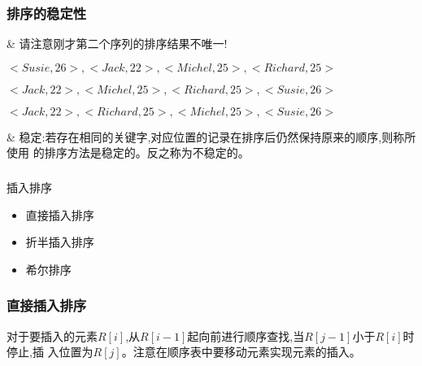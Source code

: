 \begin{frame}[fragile]
  \frametitle{排序的稳定性}
  \begin{easylist} \easyitem

    & 请注意刚才第二个序列的排序结果不唯一!

    $<Susie,26>, <Jack,22>, <Michel,25>, <Richard,25>$

    \color{red} $<Jack,22>,<Michel,25>, <Richard, 25>, <Susie,26>$

    \color{blue} $<Jack,22>, <Richard, 25>, <Michel,25>, <Susie,26>$
    
    & 稳定:若存在相同的关键字,对应位置的记录在排序后仍然保持原来的顺序,则称所使用
    的排序方法是稳定的。反之称为不稳定的。

  \end{easylist}
\end{frame}

\begin{frame}[fragile]
  \frametitle{}
  \begin{sectionbox}{插入排序}
    \begin{itemize}
    \item 直接插入排序
    \item 折半插入排序
    \item 希尔排序
    \end{itemize}
  \end{sectionbox}
\end{frame}

\begin{frame}[fragile]
  \frametitle{直接插入排序}

  对于要插入的元素$R[i]$,从$R[i-1]$起向前进行顺序查找,当$R[j-1]$小于$R[i]$时停止,插
  入位置为$R[j]$。注意在顺序表中要移动元素实现元素的插入。
  
\end{frame}
